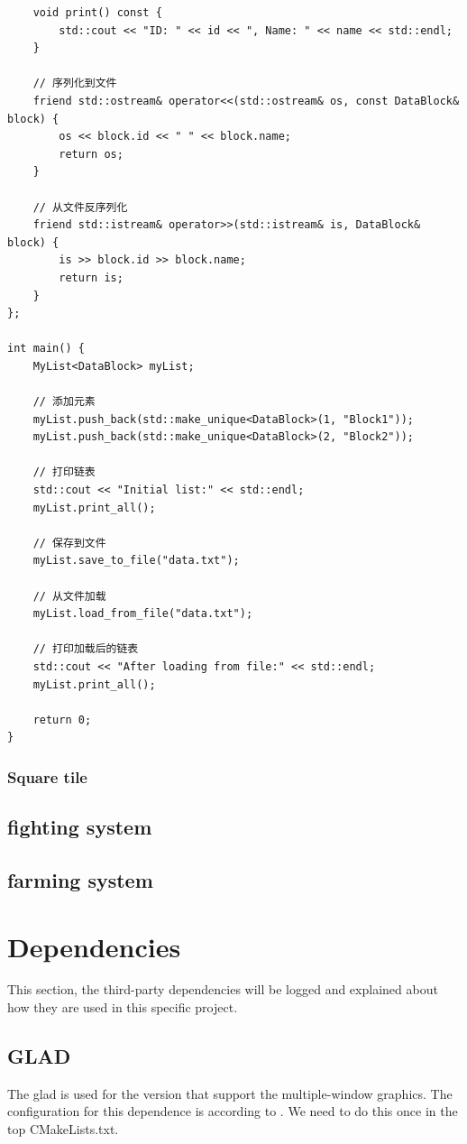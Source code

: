 \documentclass{article}
\theoremstyle{definition} %
\begin{document}
\begin{verbatim}
    void print() const {
        std::cout << "ID: " << id << ", Name: " << name << std::endl;
    }

    // 序列化到文件
    friend std::ostream& operator<<(std::ostream& os, const DataBlock& block) {
        os << block.id << " " << block.name;
        return os;
    }

    // 从文件反序列化
    friend std::istream& operator>>(std::istream& is, DataBlock& block) {
        is >> block.id >> block.name;
        return is;
    }
};

int main() {
    MyList<DataBlock> myList;

    // 添加元素
    myList.push_back(std::make_unique<DataBlock>(1, "Block1"));
    myList.push_back(std::make_unique<DataBlock>(2, "Block2"));

    // 打印链表
    std::cout << "Initial list:" << std::endl;
    myList.print_all();

    // 保存到文件
    myList.save_to_file("data.txt");

    // 从文件加载
    myList.load_from_file("data.txt");

    // 打印加载后的链表
    std::cout << "After loading from file:" << std::endl;
    myList.print_all();

    return 0;
}
\end{verbatim}

\subsubsection[tile]{Square tile}


\subsection[fighting]{fighting system}
\subsection[farming]{farming system}

\section[deps]{Dependencies}
This section, the third-party dependencies
will be logged and explained about how they
are used in this specific project.
\subsection[GLAD]{GLAD}
The glad is used for the version that support
the multiple-window graphics. The configuration
for this dependence is according to
\cite[gladMultiwinMx]{GLAD_multiwin_mx}. We
need to do this once in the top CMakeLists.txt.
\end{document}
